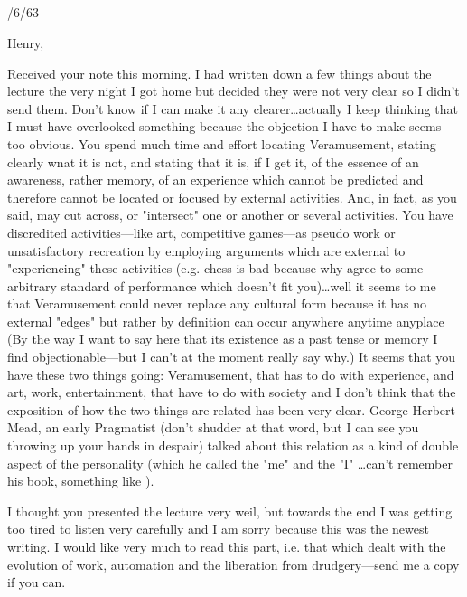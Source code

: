 \documentclass[10pt,twoside]{memoir}
\begin{document}
\begin{enumerate}
{\begin{enumerate}
\section{}

{ /6/63 \par }

Henry, 


Received your note this morning. I had written down a few things about the 
lecture the very night I got home but decided they were not very clear so I 
didn't send them. Don't know if I can make it any clearer\ldots actually I keep 
thinking that I must have overlooked something because the objection I have 
to make seems too obvious. You spend much time and effort locating 
Veramusement, stating clearly wnat it is not, and stating that it is, if I get it, 
of the essence of an awareness, rather memory, of an experience which 
cannot be predicted and therefore cannot be located or focused by external 
activities. And, in fact, as you said, may cut across, or "intersect" one or 
another or several activities. You have discredited activities---like art, 
competitive games---as pseudo work or unsatisfactory recreation by employing 
arguments which are external to "experiencing" these activities (e.g. chess is 
bad because why agree to some arbitrary standard of performance which 
doesn't fit you)\ldots well it seems to me that Veramusement could never replace 
any cultural form because it has no external "edges" but rather by definition 
can occur anywhere anytime anyplace (By the way I want to say here that 
its existence as a past tense or memory I find objectionable---but I can't at the 
moment really say why.) It seems that you have these two things going: 
Veramusement, that has to do with experience, and art, work, 
entertainment, that have to do with society and I don't think that the 
exposition of how the two things are related has been very clear. George 
Herbert Mead, an early Pragmatist (don't shudder at that word, but I can see 
you throwing up your hands in despair) talked about this relation as a kind 
of double aspect of the personality (which he called the "me" and the "I" 
\ldots can't remember his book, something like ). 

I thought you presented the lecture very weil, but towards the end I was 
getting too tired to listen very carefully and I am sorry because this was the 
newest writing. I would like very much to read this part, i.e. that which dealt 
with the evolution of work, automation and the liberation from 
drudgery---send me a copy if you can. 


\end{enumerate}}
\end{enumerate}
\end{document}
